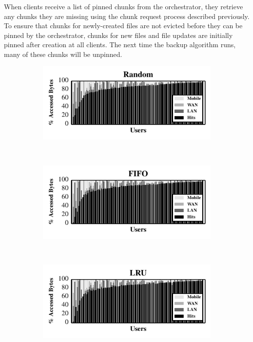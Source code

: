 When clients receive a list of pinned chunks from the orchestrator, they
retrieve any chunks they are missing using the chunk request process
described previously. To ensure that chunks for newly-created files are not
evicted before they can be pinned by the orchestrator, chunks for new files
and file updates are initially pinned after creation at all clients. The next
time the backup algorithm runs, many of these chunks will be unpinned.
\begin{figure}[t]

  \begin{subfigure}[b]{0.95\columnwidth}

    \includegraphics[width=\columnwidth]{./figures/pocketlocker/RandomSimulatorPerformanceGraph.pdf}

  \end{subfigure}\\
  \begin{subfigure}[b]{0.95\columnwidth}

    \includegraphics[width=\columnwidth]{./figures/pocketlocker/FIFOSimulatorPerformanceGraph.pdf}

  \end{subfigure}\\
  \begin{subfigure}[t]{0.95\columnwidth}

    \includegraphics[width=\columnwidth]{./figures/pocketlocker/LRUSimulatorPerformanceGraph.pdf}


\end{subfigure}
\end{figure}
